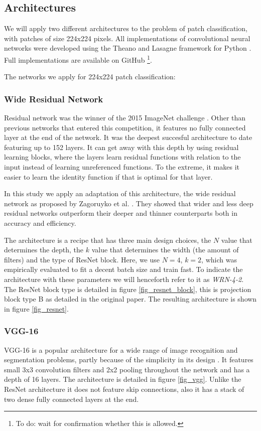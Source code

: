 \documentclass[journal]{IEEEtran}
\begin{document}
\subsection{Architectures}

We will apply two different architectures to the problem of patch classification, with patches of size 224x224 pixels. All implementations of convolutional neural networks were developed using the Theano and Lasagne framework for Python \cite{theano,lasagne}. Full implementations are available on GitHub \footnote{To do: wait for confirmation whether this is allowed.}.

\medskip

The networks we apply for 224x224 patch classification:
\medskip

\subsubsection{Wide Residual Network}
Residual network was the winner of the 2015 ImageNet challenge \cite{resnet}. Other than previous networks that entered this competition, it features no fully connected layer at the end of the network. It was the deepest succesful architecture to date featuring up to 152 layers. It can get away with this depth by using residual learning blocks, where the layers learn residual functions with relation to the input instead of learning unreferenced functions. To the extreme, it makes it easier to learn the identity function if that is optimal for that layer.

In this study we apply an adaptation of this architecture, the wide residual network as proposed by Zagoruyko et al. \cite{wideresnet}. They showed that wider and less deep residual networks outperform their deeper and thinner counterparts both in accuracy and efficiency. 

The architecture is a recipe that has three main design choices, the $N$ value that determines the depth, the $k$ value that determines the width (the amount of filters) and the type of ResNet block. Here, we use $N=4$, $k=2$, which was empirically evaluated to fit a decent batch size and train fast. To indicate the architecture with these parameters we will henceforth refer to it as \emph{WRN-4-2}. The ResNet block type is detailed in figure \ref{fig_resnet_block}, this is projection block type B as detailed in the original paper. The resulting architecture is shown in figure \ref{fig_resnet}.
\medskip
\subsubsection{VGG-16}
VGG-16 is a popular architecture for a wide range of image recognition and segmentation problems, partly because of the simplicity in its design \cite{vgg}. It features small 3x3 convolution filters and 2x2 pooling throughout the network and has a depth of 16 layers. The architecture is detailed in figure \ref{fig_vgg}. Unlike the ResNet architecture it does not feature skip connections, also it has a stack of two dense fully connected layers at the end.
\end{document}
